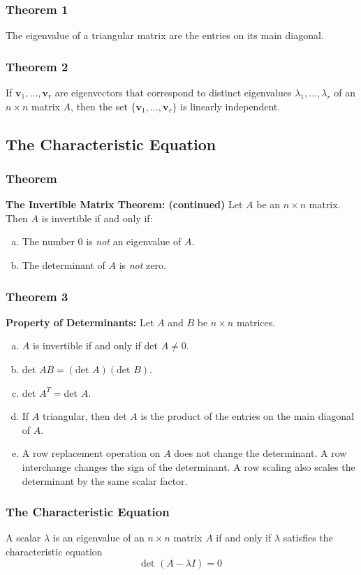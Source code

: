 \documentclass[letterpaper,11pt]{article}
\begin{document}
			\subsubsection{Theorem 1}
				The eigenvalue of a triangular matrix are the entries on its main diagonal.
			\subsubsection{Theorem 2}
				If $\mathbf{v}_1,\dots,\mathbf{v}_r$ are eigenvectors that correspond to distinct eigenvalues $\lambda_1,\dots,\lambda_r$ of an $n\times n$ matrix $A$, then the set $\{\mathbf{v}_1,\dots,\mathbf{v}_r\}$ is linearly independent.
		\subsection{The Characteristic Equation}
			\subsubsection{Theorem}
				\textbf{The Invertible Matrix Theorem: (continued)} Let $A$ be an $n\times n$ matrix. Then $A$ is invertible if and only if:
				\begin{enumerate}[a.]
					\item The number 0 is \textit{not} an eigenvalue of $A$.
					\item The determinant of $A$ is \textit{not} zero.
				\end{enumerate}
			\subsubsection{Theorem 3}
				\textbf{Property of Determinants:} Let $A$ and $B$ be $n\times n$ matrices.
				\begin{enumerate}[a.]
					\item $A$ is invertible if and only if det $A\neq 0$.
					\item det $AB=(\textrm{det }A)(\textrm{det }B)$.
					\item det $A^T=$det $A$.
					\item If $A$ triangular, then det $A$ is the product of the entries on the main diagonal of $A$.
					\item A row replacement operation on $A$ does not change the determinant. A row interchange changes the sign of the determinant. A row scaling also scales the determinant by the same scalar factor.
				\end{enumerate}
			\subsubsection{The Characteristic Equation}
				A scalar $\lambda$ is an eigenvalue of an $n\times n$ matrix $A$ if and only if $\lambda$ satisfies the characteristic equation
				\begin{equation}
					\textrm{det }(A-\lambda I)=0
				\end{equation}
\end{document}
